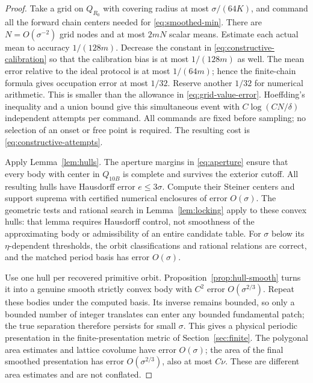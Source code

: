 \begin{proof}
Take a grid on $Q_{R_0}$ with covering radius at most
$\sigma/(64K)$, and command all the forward chain centers needed for
\eqref{eq:smoothed-min}. There are $N=O(\sigma^{-2})$ grid nodes and
at most $2mN$ scalar means. Estimate each actual mean to accuracy
$1/(128m)$. Decrease the constant in \eqref{eq:constructive-calibration}
so that the calibration bias is at most $1/(128m)$ as well. The mean
error relative to the ideal protocol is at most $1/(64m)$; hence the
finite-chain formula gives occupation error at most $1/32$. Reserve
another $1/32$ for numerical arithmetic. This is smaller than the
allowance in \eqref{eq:grid-value-error}. Hoeffding's inequality and a
union bound give this simultaneous event with
$C\log(CN/\delta)$ independent attempts per command. All commands
are fixed before sampling; no selection of an onset or free point is
required. The resulting cost is \eqref{eq:constructive-attempts}.

Apply Lemma~\ref{lem:hulls}. The aperture margins in
\eqref{eq:aperture} ensure that every body with center in $Q_{10B}$
is complete and survives the exterior cutoff. All resulting hulls
have Hausdorff error $e\le3\sigma$. Compute their Steiner centers and
support suprema with certified numerical enclosures of error $O(\sigma)$.
The geometric tests and rational search in Lemma~\ref{lem:locking}
apply to these convex hulls: that lemma requires Hausdorff control,
not smoothness of the approximating body or admissibility of an entire
candidate table. For $\sigma$ below its $\eta$-dependent thresholds,
the orbit classifications and rational relations are correct, and the
matched period basis has error $O(\sigma)$.

Use one hull per recovered primitive orbit. Proposition~\ref{prop:hull-smooth}
turns it into a genuine smooth strictly convex body with $C^2$ error
$O(\sigma^{2/3})$. Repeat these bodies under the computed basis.
Its inverse remains bounded, so only a bounded number of integer
translates can enter any bounded fundamental patch; the true separation
therefore persists for small $\sigma$. This gives a physical periodic
presentation in the finite-presentation metric of Section~\ref{sec:finite}.
The polygonal area estimates and lattice covolume have error $O(\sigma)$;
the area of the final smoothed presentation has error
$O(\sigma^{2/3})$, also at most $C\nu$. These are different area
estimates and are not conflated.


\end{proof}
